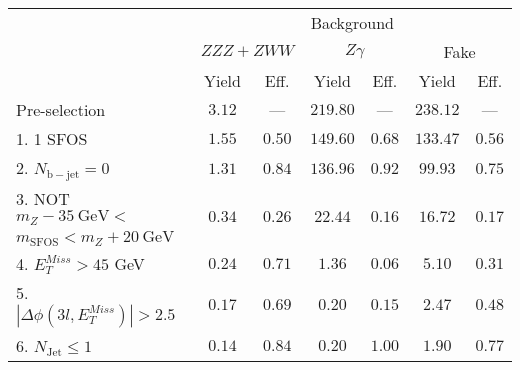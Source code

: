 \begin{tabular}{l||c|c||c|c||c|c}
\hline
 &       \multicolumn{6}{c}{Background}\\
 &  \multicolumn{2}{c||}{$ZZZ+ZWW$} & \multicolumn{2}{c||}{$Z\gamma$} & \multicolumn{2}{c}{Fake} \\ 
 & Yield & Eff. & Yield & Eff. & Yield & Eff. \\
\hline\hline
Pre-selection &  $3.12$ & --- &  $219.80$ & --- &  $238.12$ & ---  \\
\hline
1. 1 SFOS &  $1.55$ &  $0.50$ &  $149.60$ &  $0.68$ &  $133.47$ &  $0.56$ \\ 
\hline
2. $N_{\mathrm{b-jet}} = 0$ &  $1.31$ &  $0.84$ &  $136.96$ &  $0.92$ &  $99.93$ &  $0.75$ \\ 
\hline
3. NOT $m_Z - 35~\mathrm{GeV} <$  &  \multirow{2}{*}{$0.34$} &  \multirow{2}{*}{$0.26$} &  \multirow{2}{*}{$22.44$} &  \multirow{2}{*}{$0.16$} &  \multirow{2}{*}{$16.72$} &  \multirow{2}{*}{$0.17$} \\ 
\hfill $ m_{\mathrm{SFOS}} < m_Z + 20~\mathrm{GeV}$ & & & & & &  \\
\hline
4. $E_{T}^{Miss} > 45$ GeV &  $0.24$ &  $0.71$ &  $1.36$ &  $0.06$ &  $5.10$ &  $0.31$ \\ 
\hline
5. $|\Delta\phi(3l,E_{T}^{Miss})| > 2.5$ &  $0.17$ &  $0.69$ &  $0.20$ &  $0.15$ &  $2.47$ &  $0.48$ \\ 
\hline
6. $N_{\mathrm{Jet}} \leq 1$ &  $0.14$ &  $0.84$ &  $0.20$ &  $1.00$ &  $1.90$ &  $0.77$\\ 
\hline
\end{tabular}
